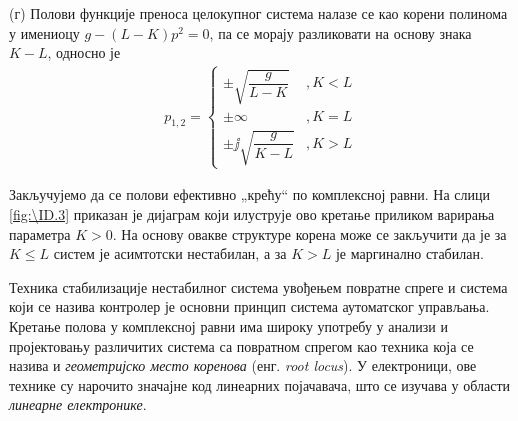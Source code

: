 (г) Полови функције преноса целокупног система налазе се као корени полинома у имениоцу $g - (L-K)p^2 = 0$, па се морају разликовати на основу 
знака $K-L$, односно је 
\begin{eqnarray}
    p_{1,2} = \begin{cases}
        \pm\sqrt{ \dfrac{g}{L-K} } &, K < L \\
        \pm\infty &, K = L \\
        \pm\jj\sqrt{\dfrac{g}{K-L}} &, K > L
    \end{cases}
\end{eqnarray}

Закључујемо да се полови ефективно „крећу“ по комплексној равни. На слици \ref{fig:\ID.3} приказан је дијаграм који илуструје ово кретање приликом 
варирања параметра $K > 0$. На основу овакве структуре корена може се закључити да је за 
$K \leq L$ систем је асимтотски нестабилан, а за $K > L$ је маргинално стабилан. 

Техника стабилизације нестабилног система увођењем повратне спреге и система који се назива контролер је основни принцип система 
аутоматског управљања. Кретање полова у комплексној равни има широку употребу у анализи и пројектовању различитих система са 
повратном спрегом као техника која се назива и \textit{геометријско место коренова} (енг. \textit{root locus}).
У електроници, ове технике су нарочито значајне код линеарних појачавача, што се изучава у области \textit{линеарне електронике}.
\clearpage
